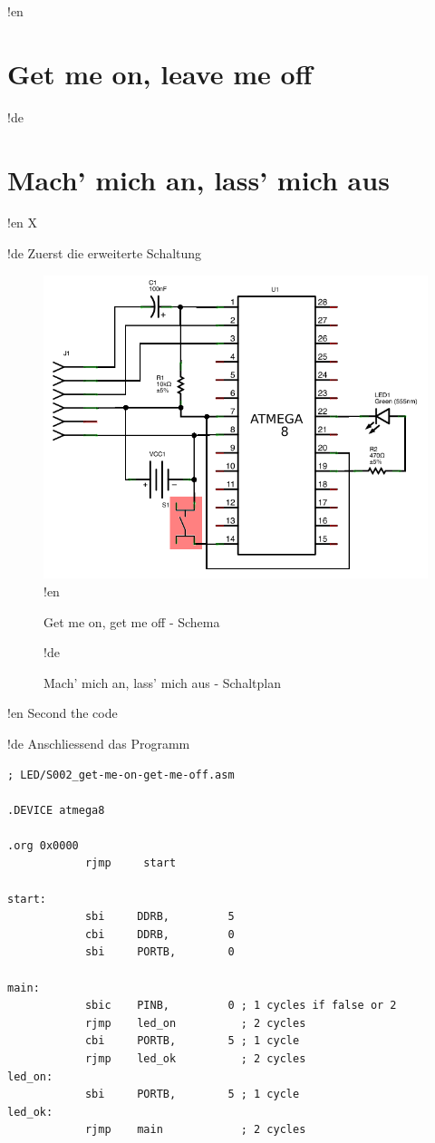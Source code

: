 !en \section{Get me on, leave me off}
!de \section{Mach' mich an, lass' mich aus}

!en X

!de Zuerst die erweiterte Schaltung

\begin{figure}[htbp]
  \centering
  \includegraphics[width=120mm]{LED/S002_get-me-on-get-me-off/schema_circuit.png}
!en   \caption{Get me on, get me off - Schema}
!de   \caption{Mach' mich an, lass' mich aus - Schaltplan}
  \label{atmega8-get-me-on-get-me-off-schema}
  \label{atmega8-get-me-on-get-me-off-schema}
\end{figure}


!en Second the code

!de Anschliessend das Programm


\begin{lstlisting}
; LED/S002_get-me-on-get-me-off.asm

.DEVICE atmega8

.org 0x0000
            rjmp     start

start:
            sbi     DDRB,         5
            cbi     DDRB,         0
            sbi     PORTB,        0

main:
            sbic    PINB,         0 ; 1 cycles if false or 2
            rjmp    led_on          ; 2 cycles
            cbi     PORTB,        5 ; 1 cycle
            rjmp    led_ok          ; 2 cycles
led_on:
            sbi     PORTB,        5 ; 1 cycle
led_ok:
            rjmp    main            ; 2 cycles
\end{lstlisting}

